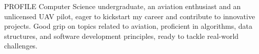 \documentclass{resume} %
\begin{document}



\begin{rSection}{PROFILE}
{
    Computer Science undergraduate, an aviation enthusiast and an unlicensed UAV pilot, eager to kickstart my
career and contribute to innovative projects. Good grip on topics related to aviation, proficient in algorithms,
data structures, and software development principles, ready to tackle real-world challenges.
}

\end{rSection}
\end{document}

